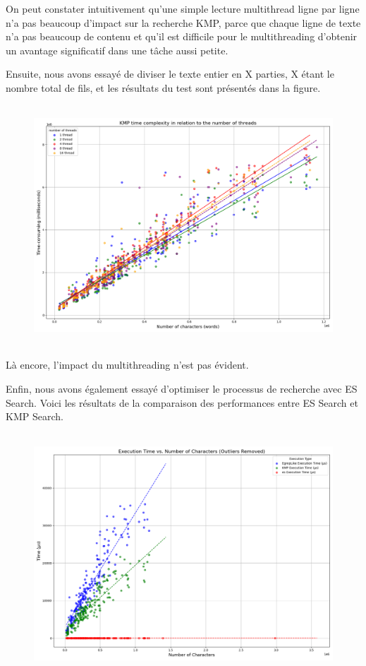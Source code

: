 \documentclass[11pt,english]{article}
\begin{document}
{    \indent On peut constater intuitivement qu'une simple lecture multithread ligne par ligne n'a pas beaucoup d'impact sur la recherche KMP, parce que chaque ligne de texte n'a pas beaucoup de contenu et qu'il est difficile pour le multithreading d'obtenir un avantage significatif dans une tâche aussi petite.

    \indent Ensuite, nous avons essayé de diviser le texte entier en X parties, X étant le nombre total de fils, et les résultats du test sont présentés dans la figure.

    \begin{figure}[H]
        \begin{center}
            \includegraphics[height=9cm]{./src/KMP_Multi_Part.png}
        \end{center}
    \end{figure}

    \indent Là encore, l'impact du multithreading n'est pas évident.

    \indent Enfin, nous avons également essayé d'optimiser le processus de recherche avec ES Search. Voici les résultats de la comparaison des performances entre ES Search et KMP Search.

    \begin{figure}[H]
        \begin{center}
            \includegraphics[height=9cm]{./src/ES_VS_KMP.png}
        \end{center}
    \end{figure}

}
\end{document}
